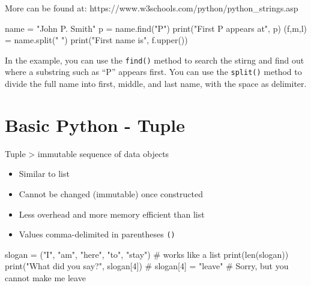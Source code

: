 \documentclass[
  letterpaper,
]{scrbook}
\newenvironment{Shaded}{\begin{snugshade}}{\end{snugshade}}
\newcommand{\BuiltInTok}[1]{\textcolor[rgb]{0.00,0.23,0.31}{#1}}
\newcommand{\CommentTok}[1]{\textcolor[rgb]{0.37,0.37,0.37}{#1}}
\newcommand{\DecValTok}[1]{\textcolor[rgb]{0.68,0.00,0.00}{#1}}
\newcommand{\NormalTok}[1]{\textcolor[rgb]{0.00,0.23,0.31}{#1}}
\newcommand{\OperatorTok}[1]{\textcolor[rgb]{0.37,0.37,0.37}{#1}}
\newcommand{\StringTok}[1]{\textcolor[rgb]{0.13,0.47,0.30}{#1}}
\providecommand{\tightlist}{%
  \setlength{\itemsep}{0pt}\setlength{\parskip}{0pt}}
\begin{document}
More can be found at:
https://www.w3schools.com/python/python\_strings.asp

\begin{Shaded}
\begin{Highlighting}[]
\NormalTok{name }\OperatorTok{=} \StringTok{"John P. Smith"}
\NormalTok{p }\OperatorTok{=}\NormalTok{ name.find(}\StringTok{"P"}\NormalTok{)}
\BuiltInTok{print}\NormalTok{(}\StringTok{"First P appears at"}\NormalTok{, p)}
\NormalTok{(f,m,l) }\OperatorTok{=}\NormalTok{ name.split(}\StringTok{" "}\NormalTok{)}
\BuiltInTok{print}\NormalTok{(}\StringTok{"First name is"}\NormalTok{, f.upper())}
\end{Highlighting}
\end{Shaded}

In the example, you can use the \texttt{find()} method to search the
stirng and find out where a substring such as ``P'' appears first. You
can use the \texttt{split()} method to divide the full name into first,
middle, and last name, with the space as delimiter.

\section*{Basic Python - Tuple}\label{basic-python---tuple}


Tuple \textgreater{} immutable sequence of data objects

\begin{itemize}
\tightlist
\item
  Similar to list
\item
  Cannot be changed (immutable) once constructed
\item
  Less overhead and more memory efficient than list
\item
  Values comma-delimited in parentheses \texttt{()}
\end{itemize}

\begin{Shaded}
\begin{Highlighting}[]
\NormalTok{slogan }\OperatorTok{=}\NormalTok{ (}\StringTok{"I"}\NormalTok{, }\StringTok{"am"}\NormalTok{, }\StringTok{"here"}\NormalTok{, }\StringTok{"to"}\NormalTok{, }\StringTok{"stay"}\NormalTok{)}
\CommentTok{\# works like a list}
\BuiltInTok{print}\NormalTok{(}\BuiltInTok{len}\NormalTok{(slogan))}
\BuiltInTok{print}\NormalTok{(}\StringTok{"What did you say?"}\NormalTok{, slogan[}\DecValTok{4}\NormalTok{])}
\CommentTok{\# slogan[4] = "leave"    \# Sorry, but you cannot make me leave}
\end{Highlighting}
\end{Shaded}
\end{document}
